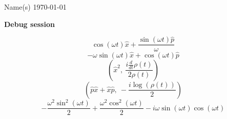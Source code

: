 \documentclass[12pt]{article}
\begin{document}
\noindent Name(s) \hfill \today \\[30pt]
\centerline{ \Large{ \textbf{ Debug session}}}
\begin{equation}
	\cos{\left(\omega t \right)} \hat{x} + \frac{\sin{\left(\omega t \right)} \hat{p}}{\omega}
\end{equation}
\begin{equation*}
	- \omega \sin{\left(\omega t \right)} \hat{x} + \cos{\left(\omega t \right)} \hat{p}
\end{equation*}
\begin{equation*}
	\left( \hat{x}^{2}, \  \frac{i \frac{d}{d t} \rho{\left(t \right)}}{2 \rho{\left(t \right)}}\right)
\end{equation*}
\begin{equation*}
	\left( \hat{p} \hat{x} + \hat{x} \hat{p}, \  - \frac{i \log{\left(\rho{\left(t \right)} \right)}}{2}\right)
\end{equation*}
\begin{equation*}
	- \frac{\omega^{2} \sin^{2}{\left(\omega t \right)}}{2} + \frac{\omega^{2} \cos^{2}{\left(\omega t \right)}}{2} - i \omega \sin{\left(\omega t \right)} \cos{\left(\omega t \right)}
\end{equation*}
{} %

\end{document}
